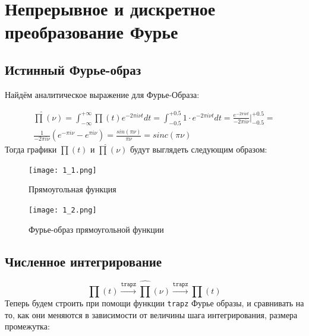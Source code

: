 \chapter{Непрерывное и дискретное преобразование Фурье}
\label{ch:chap1}



\lstset{style=mystyle}


\section{Истинный Фурье-образ}

Найдём аналитическое выражение для Фурье-Образа:

$$
\begin{aligned}
    \hat{\prod}(\nu) = \int_{-\infty}^{+\infty}\prod(t)e^{-2\pi i \nu t} dt = \int_{-0.5}^{+0.5}1\cdot e^{-2\pi i \nu t}dt =
    \frac{e^{-2\pi i \nu t}}{-2\pi i \nu}\bigg|_{-0.5}^{+0.5} = \\ \frac{1}{-2\pi i \nu}(e^{-\pi i \nu} - e^{\pi i \nu}) = \frac{sin(\pi \nu)}{\pi \nu} = sinc(\pi \nu)    
\end{aligned}
$$
Тогда графики $\prod(t)$ и $\hat{\prod}(\nu)$ будут выглядеть следующим образом:

\begin{figure}[ht]
    \centering
    \texttt{[image: 1\_1.png]}
	\caption{Прямоугольная функция}
\end{figure}

\begin{figure}[ht]
    \centering
    \texttt{[image: 1\_2.png]}
	\caption{Фурье-образ прямоугольной функции}
\end{figure}

\section{Численное интегрирование}
$$
\prod(t) \xrightarrow{\texttt{trapz}} \hat{\prod}(\nu) \xrightarrow{\texttt{trapz}} \prod(t)
$$
Теперь будем строить при помощи функции \texttt{trapz} Фурье образы, и сравнивать на то, как они меняются в зависимости от величины шага интегрирования, размера промежутка:

